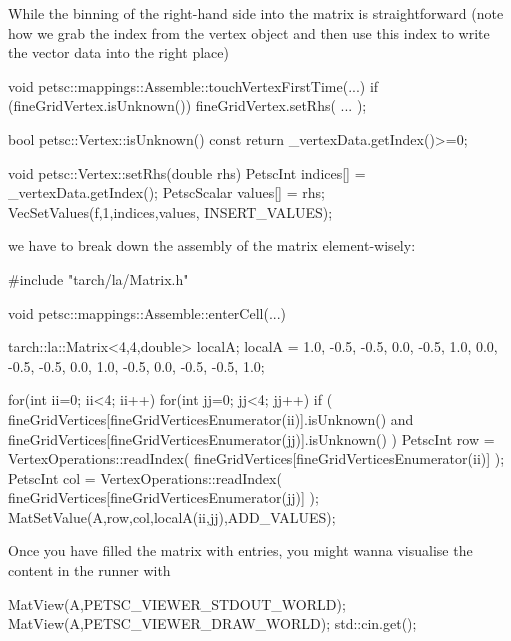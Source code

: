 \noindent
While the binning of the right-hand side into the matrix is straightforward
(note how we grab the index from the vertex object and then use this index to
write the vector data into the right place)
\begin{code}
void petsc::mappings::Assemble::touchVertexFirstTime(...) {
  if (fineGridVertex.isUnknown()) {
    fineGridVertex.setRhs(
      ...
    );
  }
}

bool petsc::Vertex::isUnknown() const {
  return _vertexData.getIndex()>=0;
}

void petsc::Vertex::setRhs(double rhs) {
  PetscInt     indices[] = {_vertexData.getIndex()};
  PetscScalar  values[]  = {rhs};
  VecSetValues(f,1,indices,values, INSERT_VALUES);
}
\end{code}

\noindent
we have to break down the assembly of the matrix element-wisely:

\begin{code}
#include "tarch/la/Matrix.h"

void petsc::mappings::Assemble::enterCell(...) {
 tarch::la::Matrix<4,4,double> localA;
 localA =  1.0,  -0.5, -0.5,  0.0,
          -0.5,   1.0,  0.0, -0.5,
          -0.5,   0.0,  1.0, -0.5,
           0.0,  -0.5, -0.5,  1.0;

 for(int ii=0; ii<4; ii++)
 for(int jj=0; jj<4; jj++) {
  if (
   fineGridVertices[fineGridVerticesEnumerator(ii)].isUnknown()
   and
   fineGridVertices[fineGridVerticesEnumerator(jj)].isUnknown()
  ) {
   PetscInt row = VertexOperations::readIndex( 
     fineGridVertices[fineGridVerticesEnumerator(ii)] );
   PetscInt col = VertexOperations::readIndex( 
     fineGridVertices[fineGridVerticesEnumerator(jj)] );
   MatSetValue(A,row,col,localA(ii,jj),ADD_VALUES);
  }
 }
}
\end{code}

\noindent
Once you have filled the matrix with entries, you might wanna visualise the
content in the runner with
\begin{code}
  MatView(A,PETSC_VIEWER_STDOUT_WORLD);
  MatView(A,PETSC_VIEWER_DRAW_WORLD);
  std::cin.get();
\end{code}

\pagebreak


